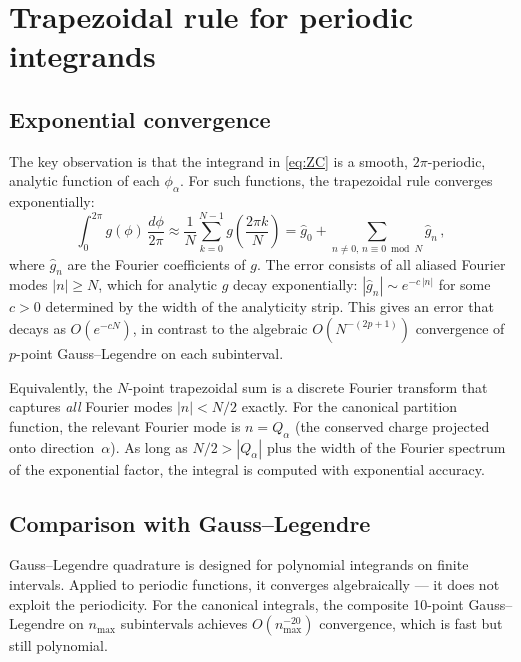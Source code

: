 \documentclass[11pt,a4paper]{article}
\begin{document}
\section{Trapezoidal rule for periodic integrands}
\label{sec:trapezoidal}

\subsection{Exponential convergence}

The key observation is that the integrand in \cref{eq:ZC} is a smooth, $2\pi$-periodic, analytic function of each $\phi_\alpha$.
For such functions, the trapezoidal rule converges exponentially:
\begin{equation}\label{eq:trap-convergence}
  \int_0^{2\pi} g(\phi)\,\frac{d\phi}{2\pi}
  \approx \frac{1}{N}\sum_{k=0}^{N-1} g\!\left(\frac{2\pi k}{N}\right)
  = \hat{g}_0 + \sum_{n \neq 0,\, n \equiv 0 \bmod N} \hat{g}_n\,,
\end{equation}
where $\hat{g}_n$ are the Fourier coefficients of $g$.
The error consists of all aliased Fourier modes $|n| \geq N$, which for analytic $g$ decay exponentially: $|\hat{g}_n| \sim e^{-c\,|n|}$ for some $c > 0$ determined by the width of the analyticity strip.
This gives an error that decays as $O(e^{-cN})$, in contrast to the algebraic $O(N^{-(2p+1)})$ convergence of $p$-point Gauss--Legendre on each subinterval.

Equivalently, the $N$-point trapezoidal sum is a discrete Fourier transform that captures \emph{all} Fourier modes $|n| < N/2$ exactly.
For the canonical partition function, the relevant Fourier mode is $n = Q_\alpha$ (the conserved charge projected onto direction~$\alpha$).
As long as $N/2 > |Q_\alpha|$ plus the width of the Fourier spectrum of the exponential factor, the integral is computed with exponential accuracy.

\subsection{Comparison with Gauss--Legendre}

Gauss--Legendre quadrature is designed for polynomial integrands on finite intervals.
Applied to periodic functions, it converges algebraically --- it does not exploit the periodicity.
For the canonical integrals, the composite 10-point Gauss--Legendre on $n_{\max}$ subintervals achieves $O(n_{\max}^{-20})$ convergence, which is fast but still polynomial.
\end{document}
